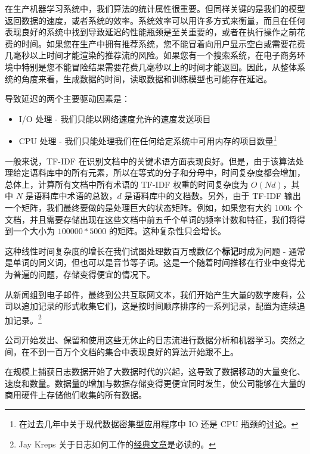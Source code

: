 \documentclass[Chinese, 11pt, table]{diazessay} %
\begin{document}
\begin{CJK}{UTF8}{gbsn}
\begin{sloppypar}
在生产机器学习系统中，我们算法的统计属性很重要。但同样关键的是我们的模型返回数据的速度，或者系统的效率。系统效率可以用许多方式来衡量，而且在任何表现良好的系统中找到导致延迟的性能瓶颈是至关重要的，或者在执行操作之前花费的时间\citep{gregg2014systems}。如果您在生产中拥有推荐系统，您不能冒着向用户显示空白或需要花费几毫秒以上时间才能渲染的推荐流的风险。如果您有一个搜索系统，在电子商务环境中特别是您不能冒险结果需要花费几毫秒以上的时间才能返回\cite{arapakis2014impact}。因此，从整体系统的角度来看，生成数据的时间，读取数据和训练模型也可能存在延迟。

导致延迟的两个主要驱动因素是：

\begin{itemize}
  \item I/O 处理 - 我们只能以网络速度允许的速度发送项目
  \item CPU 处理 - 我们只能处理我们在任何给定系统中可用内存的项目数量\footnote{在过去几年中关于现代数据密集型应用程序中 IO 还是 CPU 瓶颈的\href{https://benhoyt.com/writings/io-is-no-longer-the-bottleneck/}{讨论}。}
\end{itemize}

一般来说，TF-IDF 在识别文档中的关键术语方面表现良好。但是，由于该算法处理给定语料库中的所有元素，所以在等式的分子和分母中，时间复杂度都会增加，总体上，计算所有文档中所有术语的 TF-IDF 权重的时间复杂度为 $O(Nd)$，其中 $N$ 是语料库中术语的总数，$d$ 是语料库中的文档数。另外，由于 TF-IDF 输出一个矩阵，我们最终要做的是处理巨大的状态矩阵。例如，如果您有大约 100k 个文档，并且需要存储出现在这些文档中前五千个单词的频率计数和特征，我们将得到一个大小为 $100000*5000$ 的矩阵。这种复杂性只会增长。

这种线性时间复杂度的增长在我们试图处理数百万或数亿个\textbf{标记}时成为问题 - 通常是单词的同义词，但也可以是音节等子词。这是一个随着时间推移在行业中变得尤为普遍的问题，存储变得便宜的情况下。

从新闻组到电子邮件，最终到公共互联网文本，我们开始产生大量的数字废料，公司以追加记录的形式收集它们，这是按时间顺序排序的一系列记录，配置为连续追加记录。\footnote{Jay Kreps 关于日志如何工作的\href{https://engineering.linkedin.com/distributed-systems/log-what-every-software-engineer-should-know-about-real-time-datas-unifying}{经典文章}是必读的。}

公司开始发出、保留和使用这些无休止的日志流进行数据分析和机器学习。突然之间，在不到一百万个文档的集合中表现良好的算法开始跟不上。

在规模上捕获日志数据开始了大数据时代的兴起，这导致了数据移动的大量变化、速度和数量。数据量的增加与数据存储变得更便宜同时发生，使公司能够在大量的商用硬件上存储他们收集的所有数据。


\end{sloppypar}
\end{CJK}
\end{document}
